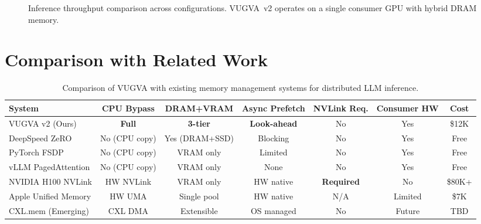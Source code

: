 \documentclass[11pt,twocolumn]{article}
\begin{document}
\begin{figure}[ht]
\centering
{}
\caption{Inference throughput comparison across configurations. VUGVA~v2 operates on a single consumer GPU with hybrid DRAM memory.}
\label{fig:throughput}
\end{figure}

\section{Comparison with Related Work}
\label{sec:related}

\begin{table}[t]
\centering
\caption{Comparison of VUGVA with existing memory management systems for distributed LLM inference.}
\label{tab:related}
\small
\begin{tabular}{lcccccc}
\toprule
\textbf{System} & \textbf{CPU Bypass} & \textbf{DRAM+VRAM} & \textbf{Async Prefetch} & \textbf{NVLink Req.} & \textbf{Consumer HW} & \textbf{Cost} \\
\midrule
VUGVA v2 (Ours) & \textbf{Full} & \textbf{3-tier} & \textbf{Look-ahead} & No & Yes & \$12K \\
DeepSpeed ZeRO & No (CPU copy) & Yes (DRAM+SSD) & Blocking & No & Yes & Free \\
PyTorch FSDP & No (CPU copy) & VRAM only & Limited & No & Yes & Free \\
vLLM PagedAttention & No (CPU copy) & VRAM only & None & No & Yes & Free \\
NVIDIA H100 NVLink & HW NVLink & VRAM only & HW native & \textbf{Required} & No & \$80K+ \\
Apple Unified Memory & HW UMA & Single pool & HW native & N/A & Limited & \$7K \\
CXL.mem (Emerging) & CXL DMA & Extensible & OS managed & No & Future & TBD \\
\bottomrule
\end{tabular}
\end{table}
\end{document}
